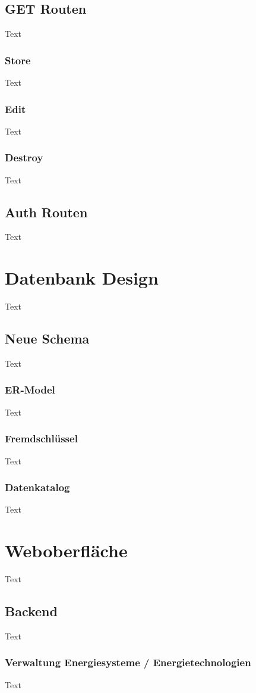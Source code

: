 \subsection{GET Routen}
Text
\subsubsection{Store}
Text
\subsubsection{Edit}
Text
\subsubsection{Destroy}
Text

\subsection{Auth Routen}
Text

\section{Datenbank Design}
Text
\subsection{Neue Schema}
Text
\subsubsection{ER-Model}
Text
\subsubsection{Fremdschlüssel}
Text
\subsubsection{Datenkatalog}
Text

\section{Weboberfläche}
Text
\subsection{Backend}
Text
\subsubsection{Verwaltung Energiesysteme / Energietechnologien}
Text
